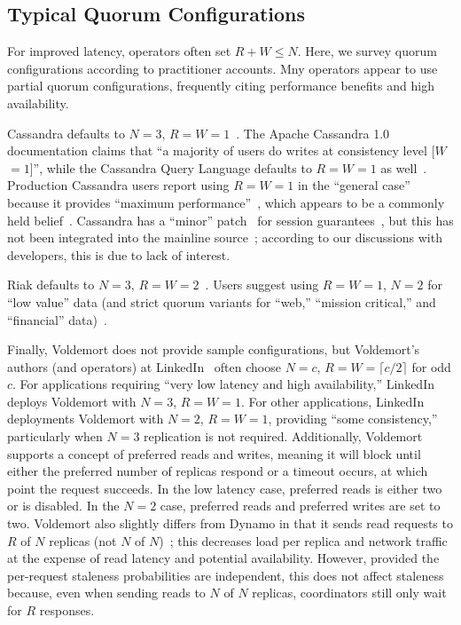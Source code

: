 \documentclass{vldb}
\newcommand{\subsectionskip}{-0em}
\begin{document}
\vspace{\subsectionskip}\subsection{Typical Quorum Configurations}

For improved latency, operators often set $R+W \leq N$.  Here, we
survey quorum configurations according to practitioner accounts.  Mny
operators appear to use partial quorum configurations, frequently
citing performance benefits and high availability.

Cassandra defaults to $N$$=$$3$,
$R$$=$$W$$=$$1$~\cite{cassandradefault}. The Apache Cassandra 1.0
documentation claims that ``a majority of users do writes at
consistency level [$W$$=$$1$]'', while the Cassandra Query Language
defaults to $R$$=$$W$$=$$1$ as well~\cite{cassandra-docs}.  Production
Cassandra users report using $R$$=$$W$$=$$1$ in the ``general case''
because it provides ``maximum performance''~\cite{maxperfblog}, which
appears to be a commonly held belief~\cite{reddit, outbrain}.
Cassandra has a ``minor'' patch~\cite{cassandra-session} for session
guarantees~\cite{sessionguarantees}, but this has not been
integrated into the mainline source~\cite{cassandra-session-revert};
according to our discussions with developers, this is due to lack of
interest.

Riak defaults to $N$$=$$3$, $R$$=$$W$$=$$2$~\cite{riakdefault-n,
  riakdefault-rw}. Users suggest using $R$$=$$W$$=$$1$, $N$$=$$2$ for
``low value'' data (and strict quorum variants for ``web,''
``mission critical,'' and ``financial'' data)~\cite{riaktalkone,
  riaktalktwo}.

 Finally, Voldemort does not provide
 sample configurations, but Voldemort's authors (and operators) at
 LinkedIn~\cite{feinbergpc} often choose $N$$=$$c$, $R$$=$$W$$=$$
 \lceil c/2 \rceil$ for odd $c$.  For applications requiring ``very
 low latency and high availability,'' LinkedIn deploys Voldemort with
 $N$$=$$3$, $R$$=$$W$$=$$1$.  For other applications, LinkedIn
 deployments Voldemort with $N$$=$$2$, $R$$=$$W$$=$$1$, providing
 ``some consistency,'' particularly when $N$$=$$3$ replication is not
 required.  Additionally, Voldemort supports a concept of preferred
 reads and writes, meaning it will block until either the preferred
 number of replicas respond or a timeout occurs, at which point the
 request succeeds.  In the low latency case, preferred reads is either
 two or is disabled.  In the $N$$=$$2$ case, preferred reads and
 preferred writes are set to two.  Voldemort also slightly differs
 from Dynamo in that it sends read requests to $R$ of $N$ replicas
 (not $N$ of $N$)~\cite{voldemortpub}; this decreases load per replica
 and network traffic at the expense of read latency and potential
 availability.  However, provided the per-request staleness
 probabilities are independent, this does not affect staleness
 because, even when sending reads to $N$ of $N$ replicas, coordinators
 still only wait for $R$ responses.
\end{document}

